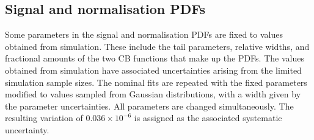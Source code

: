 


\subsection{Signal and normalisation PDFs}

Some parameters in the signal and normalisation PDFs are fixed to values obtained from simulation. These include the tail parameters, relative widths, and fractional amounts of the two CB functions that make up the PDFs. The values obtained from simulation have associated uncertainties arising from the limited simulation sample sizes. The nominal fits are repeated with the fixed parameters modified to values sampled from Gaussian distributions, with a width given by the parameter uncertainties. All parameters are changed simultaneously. The resulting variation of $0.036\times 10^{-6}$ is assigned as the associated systematic uncertainty. 

